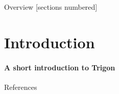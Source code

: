 \titleframe

\begin{frame}{Overview}
  [sections numbered]
  \tableofcontents[hideallsubsections]
\end{frame}


\section{Introduction}
\begin{frame}{\insertsectionhead}
  \framesubtitle{A short introduction to Trigon}
  
  
\end{frame}



\begin{frame}[allowframebreaks]{References}

  
  

\end{frame}
